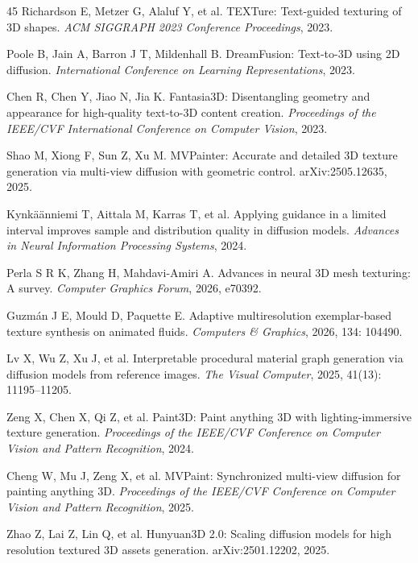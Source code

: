 \documentclass[times,twocolumn,final]{elsarticle}
\begin{document}
\begin{thebibliography}{45}
Richardson E, Metzer G, Alaluf Y, et al. TEXTure: Text-guided texturing of 3D shapes. \textit{ACM SIGGRAPH 2023 Conference Proceedings}, 2023.

Poole B, Jain A, Barron J T, Mildenhall B. DreamFusion: Text-to-3D using 2D diffusion. \textit{International Conference on Learning Representations}, 2023.

Chen R, Chen Y, Jiao N, Jia K. Fantasia3D: Disentangling geometry and appearance for high-quality text-to-3D content creation. \textit{Proceedings of the IEEE/CVF International Conference on Computer Vision}, 2023.

Shao M, Xiong F, Sun Z, Xu M. MVPainter: Accurate and detailed 3D texture generation via multi-view diffusion with geometric control. arXiv:2505.12635, 2025.

Kynk\"a\"anniemi T, Aittala M, Karras T, et al. Applying guidance in a limited interval improves sample and distribution quality in diffusion models. \textit{Advances in Neural Information Processing Systems}, 2024.

Perla S R K, Zhang H, Mahdavi-Amiri A. Advances in neural 3D mesh texturing: A survey. \textit{Computer Graphics Forum}, 2026, e70392.

Guzm\'an J E, Mould D, Paquette E. Adaptive multiresolution exemplar-based texture synthesis on animated fluids. \textit{Computers \& Graphics}, 2026, 134: 104490.

Lv X, Wu Z, Xu J, et al. Interpretable procedural material graph generation via diffusion models from reference images. \textit{The Visual Computer}, 2025, 41(13): 11195--11205.

Zeng X, Chen X, Qi Z, et al. Paint3D: Paint anything 3D with lighting-immersive texture generation. \textit{Proceedings of the IEEE/CVF Conference on Computer Vision and Pattern Recognition}, 2024.

Cheng W, Mu J, Zeng X, et al. MVPaint: Synchronized multi-view diffusion for painting anything 3D. \textit{Proceedings of the IEEE/CVF Conference on Computer Vision and Pattern Recognition}, 2025.

Zhao Z, Lai Z, Lin Q, et al. Hunyuan3D 2.0: Scaling diffusion models for high resolution textured 3D assets generation. arXiv:2501.12202, 2025.


\end{thebibliography}
\end{document}
